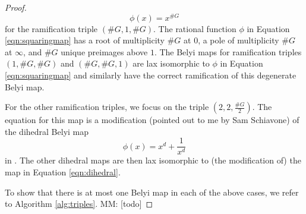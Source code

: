 \documentclass{dcthesis}
\newcommand{\mm}[1]{{\color{blue} \sf MM: [#1]}}
\theoremstyle{definition}
\theoremstyle{remark}
\numberwithin{equation}{section}
\numberwithin{figure}{section}
\begin{document}
{{\begin{proof}
      \begin{equation}\label{eqn:squaringmap}
        \phi(x) = x^{\#G}
      \end{equation}
      for the ramification triple
      $(\#G, 1, \#G)$.
      The rational function $\phi$ in Equation \ref{eqn:squaringmap}
      has a root of multiplicity $\#G$ at $0$,
      a pole of multiplicity $\#G$ at $\infty$,
      and $\#G$ unique preimages above $1$.
      The Belyi maps for ramification triples
      $(1,\#G, \#G)$ and $(\#G, \#G, 1)$
      are lax isomorphic to $\phi$ in Equation \ref{eqn:squaringmap}
      and similarly have the correct ramification of this
      degenerate Belyi map.
      \par
      For the other ramification triples, we focus on
      the triple $(2,2,\frac{\#G}{2})$.
      The equation for this map is a modification
      (pointed out to me by Sam Schiavone)
      of the dihedral Belyi map
      \begin{equation}\label{eqn:dihedral}
        \phi(x) = x^d+\frac{1}{x^d}
      \end{equation}
      in \cite[Example 5.1.2]{turkishbelyithesis}.
      The other dihedral maps are then lax isomorphic to
      (the modification of) the map in Equation \ref{eqn:dihedral}.
      \par
      To show that there is at most one Belyi map in each of the above cases,
      we refer to Algorithm \ref{alg:triples}.
      \mm{todo}
    \end{proof}
  }
}
\end{document}
